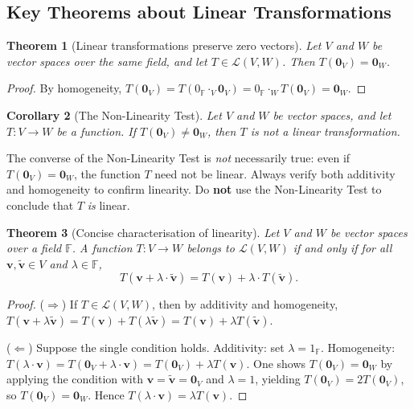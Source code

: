 \documentclass[11pt, a4paper, notitlepage]{report}
\newtheorem{theorem}{Theorem}[section]
\newtheorem{corollary}[theorem]{Corollary}
\theoremstyle{definition}
\theoremstyle{remark}
\begin{document}
\subsection{Key Theorems about Linear Transformations}

\begin{theorem}[Linear transformations preserve zero vectors]\label{thm:lt-zero}
Let $V$ and $W$ be vector spaces over the same field, and let $T \in \mathcal{L}(V,W)$. Then
$T(\mathbf{0}_V) = \mathbf{0}_W$.
\end{theorem}
\begin{proof}
By homogeneity, $T(\mathbf{0}_V) = T(0_\mathbb{F} \cdot_V \mathbf{0}_V) = 0_\mathbb{F} \cdot_W T(\mathbf{0}_V) = \mathbf{0}_W$.
\end{proof}

\begin{corollary}[The Non-Linearity Test]\label{cor:non-linearity}
Let $V$ and $W$ be vector spaces, and let $T : V \to W$ be a function. If $T(\mathbf{0}_V) \neq \mathbf{0}_W$,
then $T$ is \emph{not} a linear transformation.
\end{corollary}

\begin{warning}[title={Warning: Non-Linearity Test is one-directional}]
The converse of the Non-Linearity Test is \emph{not} necessarily true: even if $T(\mathbf{0}_V) = \mathbf{0}_W$,
the function $T$ need not be linear. Always verify both additivity and homogeneity to confirm linearity.
Do \textbf{not} use the Non-Linearity Test to conclude that $T$ \emph{is} linear.
\end{warning}

\begin{theorem}[Concise characterisation of linearity]\label{thm:linearity-concise}
Let $V$ and $W$ be vector spaces over a field $\mathbb{F}$. A function $T : V \to W$ belongs to
$\mathcal{L}(V,W)$ if and only if for all $\mathbf{v}, \tilde{\mathbf{v}} \in V$ and $\lambda \in \mathbb{F}$,
\[
  T(\mathbf{v} + \lambda \cdot \tilde{\mathbf{v}}) = T(\mathbf{v}) + \lambda \cdot T(\tilde{\mathbf{v}}).
\]
\end{theorem}
\begin{proof}
($\Rightarrow$) If $T \in \mathcal{L}(V,W)$, then by additivity and homogeneity,
$T(\mathbf{v} + \lambda\tilde{\mathbf{v}}) = T(\mathbf{v}) + T(\lambda\tilde{\mathbf{v}}) = T(\mathbf{v}) + \lambda T(\tilde{\mathbf{v}})$.

($\Leftarrow$) Suppose the single condition holds. Additivity: set $\lambda = 1_\mathbb{F}$.
Homogeneity: $T(\lambda \cdot \mathbf{v}) = T(\mathbf{0}_V + \lambda \cdot \mathbf{v}) = T(\mathbf{0}_V) + \lambda T(\mathbf{v})$.
One shows $T(\mathbf{0}_V) = \mathbf{0}_W$ by applying the condition with $\mathbf{v} = \tilde{\mathbf{v}} = \mathbf{0}_V$
and $\lambda = 1$, yielding $T(\mathbf{0}_V) = 2T(\mathbf{0}_V)$, so $T(\mathbf{0}_V) = \mathbf{0}_W$.
Hence $T(\lambda \cdot \mathbf{v}) = \lambda T(\mathbf{v})$.
\end{proof}
\end{document}
